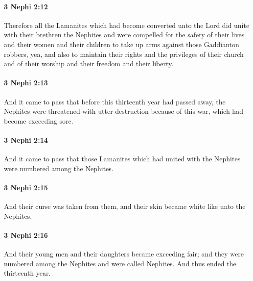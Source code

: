 		\paragraph{3 Nephi 2:12} %
			\label{3NEPHI-2-12}

			Therefore all the Lamanites which had become converted unto the Lord
			did unite with their brethren the Nephites
			and were compelled for the safety of their lives
			and their women and their children
			to take up arms against those Gaddianton robbers,
			yea, and also to maintain their rights and the privileges of their church
			and of their worship and their freedom and their liberty.

		\paragraph{3 Nephi 2:13} %
			\label{3NEPHI-2-13}

			And it came to pass that before this thirteenth year had passed away,
			the Nephites were threatened with utter destruction
			because of this war, which had become exceeding sore.

		\paragraph{3 Nephi 2:14} %
			\label{3NEPHI-2-14}

			And it came to pass that
			those Lamanites which had united with the Nephites
			were numbered among the Nephites.

		\paragraph{3 Nephi 2:15} %
			\label{3NEPHI-2-15}

			And their curse was taken from them,
			and their skin became white like unto the Nephites.

		\paragraph{3 Nephi 2:16} %
			\label{3NEPHI-2-16}

			And their young men and their daughters became exceeding fair;
			and they were numbered among the Nephites and were called Nephites.
			And thus ended the thirteenth year.

